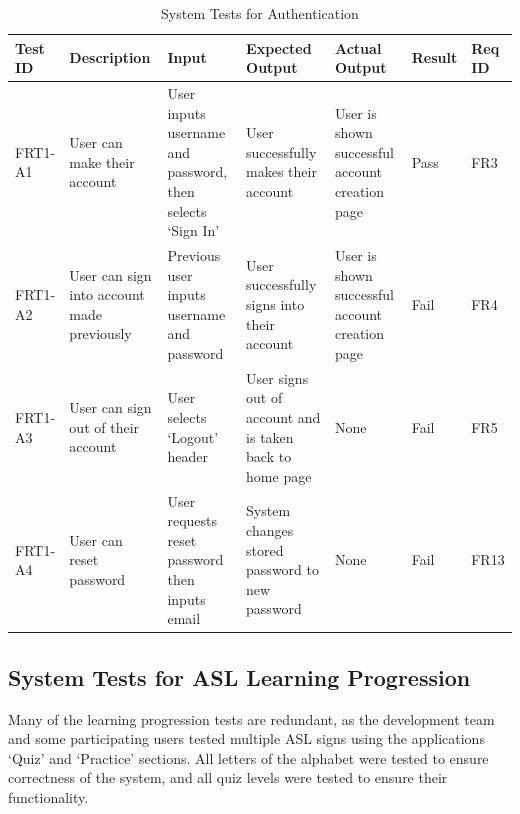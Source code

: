 \documentclass[12pt, titlepage]{article}
\begin{document}
\begin{longtable}{|p{1cm}|p{2.5cm}|p{2cm}|p{2cm}|p{2cm}|p{1.5cm}|p{1cm}|}
\caption{System Tests for Authentication} \\
\hline
\textbf{Test ID} & \textbf{Description} & \textbf{Input} & \textbf{Expected Output} & \textbf{Actual Output} & \textbf{Result} & \textbf{Req ID}\\
\hline
FRT1-A1 & User can make their account & User inputs username and password, then selects `Sign In' & User successfully makes their account & User is shown successful account creation page & Pass & FR3\\
\hline
FRT1-A2 & User can sign into account made previously & Previous user inputs username and password & User successfully signs into their account & User is shown successful account creation page & Fail & FR4 \\
\hline
FRT1-A3 & User can sign out of their account & User selects `Logout' header & User signs out of account and is taken back to home page & None & Fail & FR5 \\
\hline
FRT1-A4 & User can reset password & User requests reset password then inputs email & System changes stored password to new password & None & Fail & FR13 \\
\bottomrule
\end{longtable}

\subsection{System Tests for ASL Learning Progression}

Many of the learning progression tests are redundant, as the development team and some participating users tested multiple ASL signs using the applications `Quiz' and `Practice' sections. All letters of the alphabet were tested to ensure correctness of the system, and all quiz levels were tested to ensure their functionality. 
\end{document}

